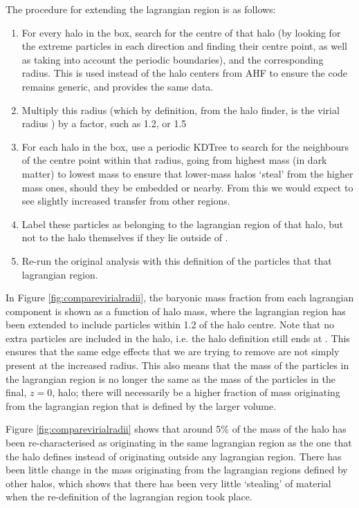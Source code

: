 The procedure for extending the lagrangian region is as follows:
\begin{enumerate}
    \item For every halo in the box, search for the centre of that halo (by
          looking for the extreme particles in each direction and finding
          their centre point, as well as taking into account the periodic
          boundaries), and the corresponding radius. This is used instead of the
          halo centers from AHF to ensure the code remains generic, and provides
          the same data.
    \item Multiply this radius (which by definition, from the halo finder, is
          the virial radius \rvir{}) by a factor, such as 1.2, or 1.5
    \item For each halo in the box, use a periodic KDTree to search for the
          neighbours of the centre point within that radius, going from
          highest mass (in dark matter) to lowest mass to ensure that
          lower-mass halos `steal' from the higher mass ones, should they
          be embedded or nearby. From this we would expect to see slightly
          increased transfer from other regions.
    \item Label these particles as belonging to the lagrangian region of
          that halo, but not to the halo themselves if they lie outside
          of \rvir{}.
    \item Re-run the original analysis with this definition of the particles that
          that lagrangian region.
\end{enumerate}

In Figure \ref{fig:comparevirialradii}, the baryonic mass fraction from each
lagrangian component is shown as a function of halo mass, where the
lagrangian region has been extended to include particles within 1.2\rvir{} of
the halo centre. Note that no extra particles are included in the halo, i.e.
the halo definition still ends at \rvir{}. This ensures that the same edge
effects that we are trying to remove are not simply present at the increased
radius. This also means that the mass of the particles in the lagrangian
region is no longer the same as the mass of the particles in the final,
$z=0$, halo; there will necessarily be a higher fraction of mass originating
from the lagrangian region that is defined by the larger volume.

Figure \ref{fig:comparevirialradii} shows that around 5\% of the mass of the
halo has been re-characterised as originating in the same lagrangian region
as the one that the halo defines instead of originating outside any lagrangian
region. There has been little change in the mass originating from the
lagrangian regions defined by other halos, which shows that there has been
very little `stealing' of material when the re-definition of the lagrangian
region took place.

